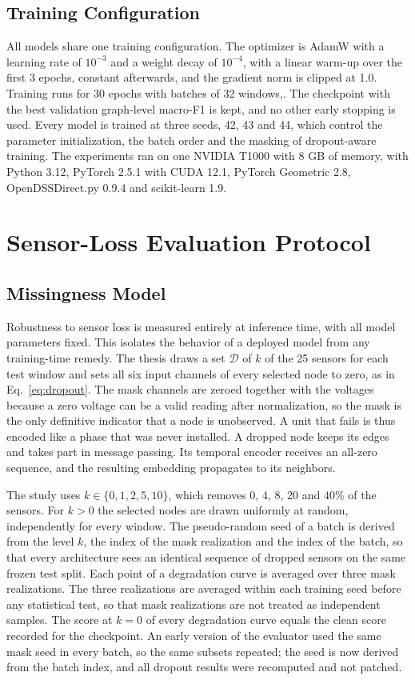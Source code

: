 \documentclass[MTech]{ugthesis}
\begin{document}
\subsection{Training Configuration}

All models share one training configuration. The optimizer is AdamW with a learning rate of $10^{-3}$ and a weight decay of $10^{-4}$, with a linear warm-up over the first 3 epochs, constant afterwards, and the gradient norm is clipped at 1.0. Training runs for 30 epochs with batches of 32 windows,. The checkpoint with the best validation graph-level macro-F1 is kept, and no other early stopping is used. Every model is trained at three seeds, 42, 43 and 44, which control the parameter initialization, the batch order and the masking of dropout-aware training. The experiments ran on one NVIDIA T1000 with 8 GB of memory, with Python 3.12, PyTorch 2.5.1 with CUDA 12.1, PyTorch Geometric 2.8, OpenDSSDirect.py 0.9.4 and scikit-learn 1.9.

\section{Sensor-Loss Evaluation Protocol}
\label{sec:protocol}

\subsection{Missingness Model}

Robustness to sensor loss is measured entirely at inference time, with all model parameters fixed. This isolates the behavior of a deployed model from any training-time remedy. The thesis draws a set $\mathcal{D}$ of $k$ of the 25 sensors for each test window and sets all six input channels of every selected node to zero, as in Eq.~\eqref{eq:dropout}. The mask channels are zeroed together with the voltages because a zero voltage can be a valid reading after normalization, so the mask is the only definitive indicator that a node is unobserved. A unit that fails is thus encoded like a phase that was never installed. A dropped node keeps its edges and takes part in message passing. Its temporal encoder receives an all-zero sequence, and the resulting embedding propagates to its neighbors.

The study uses $k\in\{0,1,2,5,10\}$, which removes 0, 4, 8, 20 and 40\% of the sensors. For $k>0$ the selected nodes are drawn uniformly at random, independently for every window. The pseudo-random seed of a batch is derived from the level $k$, the index of the mask realization and the index of the batch, so that every architecture sees an identical sequence of dropped sensors on the same frozen test split. Each point of a degradation curve is averaged over three mask realizations. The three realizations are averaged within each training seed before any statistical test, so that mask realizations are not treated as independent samples. The score at $k=0$ of every degradation curve equals the clean score recorded for the checkpoint. An early version of the evaluator used the same mask seed in every batch, so the same subsets repeated; the seed is now derived from the batch index, and all dropout results were recomputed and not patched.
\end{document}
